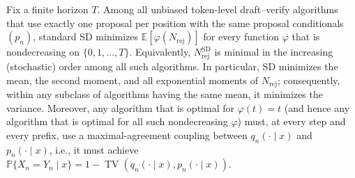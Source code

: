 \begin{theorem}\label{thm:sd-stepwise-coupling}
Fix a finite horizon $T$. Among all unbiased token-level draft--verify algorithms that use exactly one proposal per position with the same proposal conditionals $(p_n)$, standard SD minimizes $\mathbb E[\varphi(N_{\mathrm{rej}})]$ for every function $\varphi$ that is nondecreasing on $\{0,1,\dots,T\}$. Equivalently, $N_{\mathrm{rej}}^{\mathrm{SD}}$ is minimal in the increasing (stochastic) order among all such algorithms. In particular, SD minimizes the mean, the second moment, and all exponential moments of $N_{\mathrm{rej}}$; consequently, within any subclass of algorithms having the same mean, it minimizes the variance. Moreover, any algorithm that is optimal for $\varphi(t)=t$ (and hence any algorithm that is optimal for all such nondecreasing $\varphi$) must, at every step and every prefix, use a maximal-agreement coupling between $q_n(\cdot\mid x)$ and $p_n(\cdot\mid x)$, i.e., it must achieve $\mathbb P\{X_n=Y_n\mid x\}=1-\operatorname{TV}(q_n(\cdot\mid x),p_n(\cdot\mid x))$.
\end{theorem}


